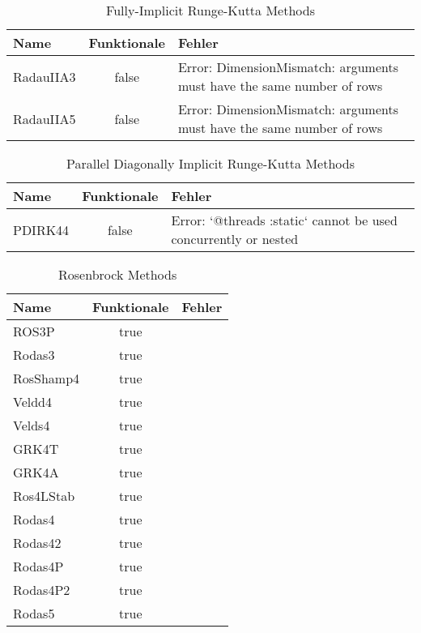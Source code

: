 \begin{table}[H]
    \centering

    \begin{tabular}{p{5cm}|c|p{5cm}}
        Name & Funktionale & Fehler \\
        \hline\hline
        RadauIIA3 & false & Error: DimensionMismatch: arguments must have the same number of rows \\
        RadauIIA5 & false & Error: DimensionMismatch: arguments must have the same number of rows \\
    \end{tabular}
    \caption{Fully-Implicit Runge-Kutta Methods}
    \label{tab:my_label}
\end{table}

\begin{table}[H]
    \centering

    \begin{tabular}{p{5cm}|c|p{5cm}}
        Name & Funktionale & Fehler \\
        \hline\hline
        PDIRK44 & false & Error: `@threads :static` cannot be used concurrently or nested \\
    \end{tabular}
    \caption{Parallel Diagonally Implicit Runge-Kutta Methods}
    \label{tab:my_label}
\end{table}

\begin{table}[H]
    \centering

    \begin{tabular}{p{5cm}|c|p{5cm}}
        Name & Funktionale & Fehler \\
        \hline\hline
        ROS3P     & true & \\ 
        Rodas3    & true & \\ 
        RosShamp4 & true & \\ 
        Veldd4    & true & \\ 
        Velds4    & true & \\ 
        GRK4T     & true & \\ 
        GRK4A     & true & \\ 
        Ros4LStab & true & \\ 
        Rodas4    & true & \\ 
        Rodas42   & true & \\ 
        Rodas4P   & true & \\ 
        Rodas4P2  & true & \\ 
        Rodas5    & true & \\ 
    \end{tabular}
    \caption{Rosenbrock Methods}
    \label{tab:my_label}
\end{table}

